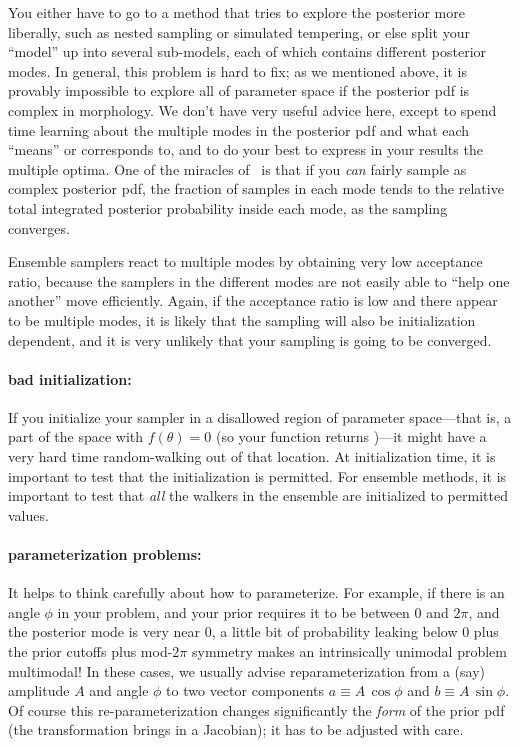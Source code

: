 \documentclass[modern]{aastex61}
\newcommand{\MCMC}{\acronym{MCMC}}
\newcommand{\pars}{\theta}
\begin{document}
You either have to go to a method that tries to explore the posterior
  more liberally, such as nested sampling or simulated tempering,
  or else split your ``model'' up into several sub-models,
  each of which contains different posterior modes.
In general, this problem is hard to fix;
  as we mentioned above, it is provably impossible
  to explore all of parameter space if the posterior pdf is
  complex in morphology.
We don't have very useful advice here, except to
  spend time learning about the multiple modes in the posterior pdf
  and what each ``means'' or corresponds to,
  and to do your best to express in your results the multiple optima.
One of the miracles of \MCMC\ is that if you \emph{can} fairly sample
  as complex posterior pdf,
  the fraction of samples in each mode
  tends to the relative total integrated posterior probability inside each mode,
  as the sampling converges.

Ensemble samplers react to multiple modes
  by obtaining very low acceptance ratio,
  because the samplers in the different modes are not easily able to ``help one another''
  move efficiently.
Again, if the acceptance ratio is low and there appear to be multiple modes,
  it is likely that the sampling will also be initialization dependent,
  and it is very unlikely that your sampling is going to be converged.

\paragraph{bad initialization:}
If you initialize your sampler in a disallowed region of parameter
space---that is, a part of the space with $f(\pars)=0$ (so your
 function returns )---it might have a very
hard time random-walking out of that location.
At initialization time, it is important to test that the
initialization is permitted.
For ensemble methods, it is important to test that \emph{all} the
walkers in the ensemble are initialized to permitted values.

\paragraph{parameterization problems:}
It helps to think carefully about how to parameterize.
For example, if there is an angle $\phi$ in your problem,
  and your prior requires it to be between $0$ and $2\pi$,
  and the posterior mode is very near $0$,
  a little bit of probability leaking below $0$ plus the prior cutoffs plus mod-$2\pi$ symmetry
  makes an intrinsically unimodal problem multimodal!
In these cases, we usually advise reparameterization from a (say) amplitude $A$ and angle $\phi$
  to two vector components $a\equiv A\,\cos\phi$ and $b\equiv A\,\sin\phi$.
Of course this re-parameterization changes significantly the \emph{form} of the prior pdf
  (the transformation brings in a Jacobian);
  it has to be adjusted with care.
\end{document}
